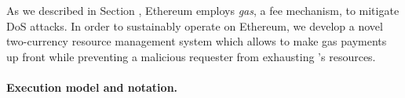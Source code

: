 


As we described in Section , Ethereum employs \emph{gas}, a fee mechanism, to mitigate DoS attacks.
In order to sustainably operate \tc on Ethereum, we develop a novel two-currency resource management system which allows
\tc to make gas payments up front while preventing a malicious requester from exhausting \tc's resources.


\paragraph{Execution model and notation.}

%
%
%
%

